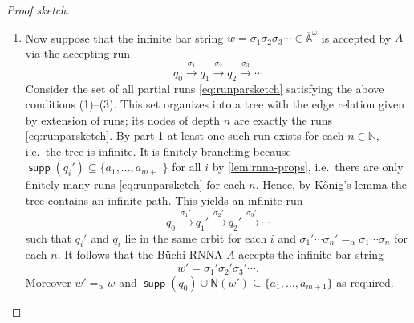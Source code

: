 \documentclass[final,a4paper,UKenglish,thm-restate,autoref,numberwithinsect]{lipics-v2021}
\newcommand{\Names}[1]{\mathsf{N}(#1)}
\newcommand{\barA}{\overline{\names}}
\numberwithin{equation}{section}
\newcommand{\xto}[1]{\xrightarrow{~#1~}}
\newcommand{\seq}{\subseteq}
\newcommand{\Nat}{{\mathbb{N}}}
\newcommand{\+}[1]{\mathcal{#1}\xspace}
\newcommand{\names}{\mathbb{A}}
\DeclareMathOperator{\supp}{\mathsf{supp}} %
\theoremstyle{definition}
\begin{document}
\begin{proof}[Proof sketch]
\begin{enumerate}
\item Now suppose that the infinite bar string $w=\sigma_1\sigma_2\sigma_3\cdots\in \barA^\omega$ is accepted by $A$ via the accepting run
  \[
    q_0 \xto{\sigma_1} q_1 \xto{\sigma_2} q_2 \xto{\sigma_3} \cdots
  \]
 Consider the set of all
  partial runs \eqref{eq:runparsketch} satisfying the above conditions (1)--(3). This set organizes into a tree with the edge relation
  given by extension of runs; its nodes of depth $n$ are exactly
  the runs \eqref{eq:runparsketch}. By part 1 at least one
  such run exists for each $n\in \Nat$, i.e.~the tree is infinite. It
  is finitely branching because
  $\supp(q_i')\seq \{a_1,\ldots, a_{m+1}\}$ for all $i$ by \autoref{lem:rnna-props}, i.e.~there
  are only finitely many runs \eqref{eq:runparsketch} for each $n$. Hence, by
  K\H{o}nig's
  lemma the tree contains an infinite path. This yields an infinite run
  \[
    q_0 \xto{\sigma_1'} q_1' \xto{\sigma_2'} q_2' \xto{\sigma_3'}
    \cdots
  \]
  such that $q_i'$ and $q_i$ lie in the same orbit for each $i$ and
  $\sigma_1'\cdots \sigma_n'=_\alpha \sigma_1\cdots \sigma_n$ for each
  $n$. It follows that the Büchi RNNA $A$ accepts the infinite bar string
  \[
    w'= \sigma_1'\sigma_2'\sigma_3'\cdots.
  \]
 Moreover $w'=_\alpha w$ and
  $\supp(q_0)\cup \Names{w'}\seq \{a_1,\ldots, a_{m+1}\}$ as required.\qedhere
\end{enumerate}
\end{proof}
\end{document}
